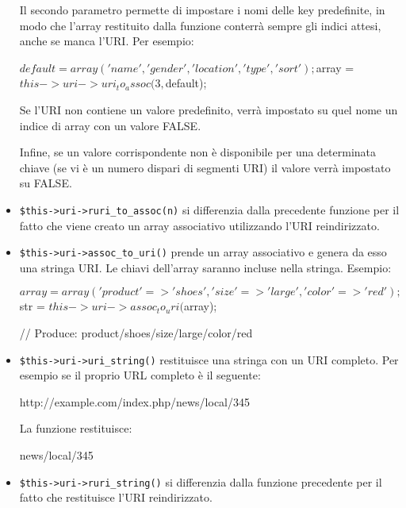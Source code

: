 \begin{itemize}
Il secondo parametro permette di impostare i nomi delle key predefinite, in modo che l'array restituito dalla funzione conterrà sempre gli indici attesi, anche se manca l'URI. Per esempio:

\begin{code}
$default = array('name', 'gender', 'location', 'type', 'sort');

$array = $this->uri->uri_to_assoc(3, $default);
\end{code}

Se l'URI non contiene un valore predefinito, verrà impostato su quel nome un indice di array con un valore FALSE.

Infine, se un valore corrispondente non è disponibile per una determinata chiave (se vi è un numero dispari di segmenti URI) il valore verrà impostato su FALSE.

\item \verb|$this->uri->ruri_to_assoc(n)| si differenzia dalla precedente funzione per il fatto che viene creato un array associativo utilizzando l'URI reindirizzato.

\item \verb|$this->uri->assoc_to_uri()| prende un array associativo e genera da esso una stringa URI. Le chiavi dell'array saranno incluse nella stringa. Esempio:

\begin{code}
$array = array('product' => 'shoes', 'size' => 'large', 'color' => 'red');

$str = $this->uri->assoc_to_uri($array);

// Produce: product/shoes/size/large/color/red
\end{code}

\item \verb|$this->uri->uri_string()| restituisce una stringa con un URI completo. Per esempio se il proprio URL completo è il seguente:

\begin{code}
http://example.com/index.php/news/local/345
\end{code}

La funzione restituisce:

\begin{code}
news/local/345
\end{code}

\item \verb|$this->uri->ruri_string()| si differenzia dalla funzione precedente per il fatto che restituisce l'URI reindirizzato.


\end{itemize}

